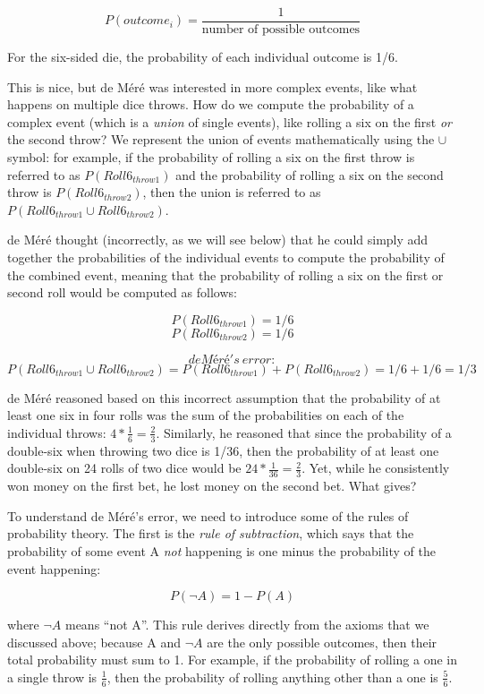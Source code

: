 \documentclass[12pt,]{book}
\theoremstyle{definition}
\theoremstyle{definition}
\theoremstyle{definition}
\theoremstyle{remark}
\begin{document}
\[
P(outcome_i) = \frac{1}{\text{number of possible outcomes}}
\]

For the six-sided die, the probability of each individual outcome is 1/6.

This is nice, but de Méré was interested in more complex events, like what happens on multiple dice throws. How do we compute the probability of a complex event (which is a \emph{union} of single events), like rolling a six on the first \emph{or} the second throw? We represent the union of events mathematically using the \(\cup\) symbol: for example, if the probability of rolling a six on the first throw is referred to as \(P(Roll6_{throw1})\) and the probability of rolling a six on the second throw is \(P(Roll6_{throw2})\), then the union is referred to as \(P(Roll6_{throw1} \cup Roll6_{throw2})\).

de Méré thought (incorrectly, as we will see below) that he could simply add together the probabilities of the individual events to compute the probability of the combined event, meaning that the probability of rolling a six on the first or second roll would be computed as follows:

\[
P(Roll6_{throw1}) = 1/6
\]
\[
P(Roll6_{throw2}) = 1/6
\]

\[
de Méré's \ error:
\]
\[
P(Roll6_{throw1} \cup Roll6_{throw2}) = P(Roll6_{throw1}) + P(Roll6_{throw2}) = 1/6 + 1/6 = 1/3
\]

de Méré reasoned based on this incorrect assumption that the probability of at least one six in four rolls was the sum of the probabilities on each of the individual throws: \(4*\frac{1}{6}=\frac{2}{3}\). Similarly, he reasoned that since the probability of a double-six when throwing two dice is 1/36, then the probability of at least one double-six on 24 rolls of two dice would be \(24*\frac{1}{36}=\frac{2}{3}\). Yet, while he consistently won money on the first bet, he lost money on the second bet. What gives?

To understand de Méré's error, we need to introduce some of the rules of probability theory. The first is the \emph{rule of subtraction}, which says that the probability of some event A \emph{not} happening is one minus the probability of the event happening:

\[
P(\neg A) = 1 - P(A)
\]

where \(\neg A\) means ``not A''. This rule derives directly from the axioms that we discussed above; because A and \(\neg A\) are the only possible outcomes, then their total probability must sum to 1. For example, if the probability of rolling a one in a single throw is \(\frac{1}{6}\), then the probability of rolling anything other than a one is \(\frac{5}{6}\).
\end{document}
